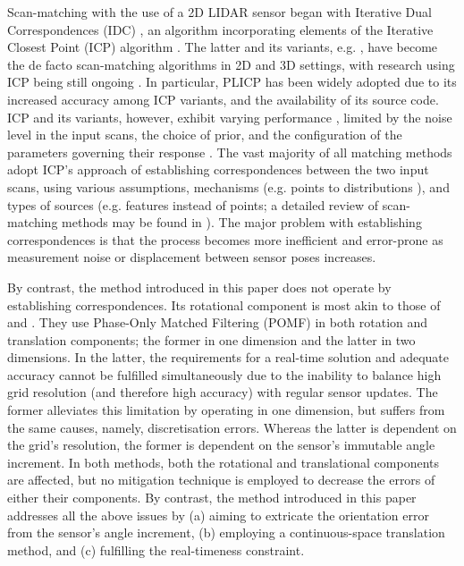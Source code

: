 Scan-matching with the use of a 2D LIDAR sensor began with Iterative Dual
Correspondences (IDC) \cite{FengLu1994}, an algorithm incorporating elements of
the Iterative Closest Point (ICP) algorithm \cite{Besl1992b}. The latter and
its variants, e.g.  \cite{Pfister,Chetverikov,Censi2008b,Segal2009}, have
become the de facto scan-matching algorithms in 2D and 3D settings, with
research using ICP being still ongoing
\cite{Wang2018a,Tian2019a,Marchel2020,Koide2021}. In particular, PLICP
\cite{Censi2008b} has been widely adopted due to its increased accuracy among
ICP variants, and the availability of its source code. ICP and its variants,
however, exhibit varying performance \cite{Donoso2017a}, limited by the noise
level in the input scans, the choice of prior, and the configuration of the
parameters governing their response \cite{Filotheou2022a}. The vast majority of
all matching methods adopt ICP's approach of establishing correspondences
between the two input scans, using various assumptions, mechanisms (e.g. points
to distributions \cite{Biber,Bouraine2020}), and types of sources (e.g.
features instead of points; a detailed review of scan-matching methods may be
found in \cite{Filotheou2020a}). The major problem with establishing
correspondences is that the process becomes more inefficient and error-prone as
measurement noise or displacement between sensor poses increases.

By contrast, the method introduced in this paper does not operate by
establishing correspondences. Its rotational component is most akin to those of
\cite{Yu2018} and \cite{Jiang2018}. They use Phase-Only Matched Filtering
(POMF) \cite{Qin-ShengChen1994} in both rotation and translation components;
the former in one dimension and the latter in two dimensions. In the latter,
the requirements for a real-time solution and adequate accuracy cannot be
fulfilled simultaneously due to the inability to balance high grid resolution
(and therefore high accuracy) with regular sensor updates. The former
alleviates this limitation by operating in one dimension, but suffers from the
same causes, namely, discretisation errors. Whereas the latter is dependent on
the grid's resolution, the former is dependent on the sensor's immutable angle
increment.  In both methods, both the rotational and translational components
are affected, but no mitigation technique is employed to decrease the errors of
either their components. By contrast, the method introduced in this paper
addresses all the above issues by (a) aiming to extricate the orientation error
from the sensor's angle increment, (b) employing a continuous-space translation
method, and (c) fulfilling the real-timeness constraint.
